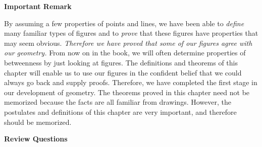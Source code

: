 \documentclass[11pt]{book}
\theoremstyle{bkplain}
\theoremstyle{XIplainnote}
\theoremstyle{bkplain}
\theoremstyle{bkplain}
\begin{document}
\begin{center}\bfseries Important Remark\end{center}

By assuming a few properties of points and lines, we have been able to
\emph{define} many familiar types of figures and to \emph{prove} that these
figures have properties that may seem obvious. \emph{Therefore we have proved
that some of our figures agree with our geometry.} From now on in the book, we
will often determine properties of betweenness by just looking at figures. The
definitions and theorems of this chapter will enable us to use our figures in the
confident belief that we could always go back and supply proofs. Therefore, we
have completed the first stage in our development of geometry. The theorems
proved in this chapter need not be memorized because the facts are all familiar
from drawings. However, the postulates and definitions of this chapter are very
important, and therefore should be memorized.

\begin{center}\bfseries Review Questions\end{center}
\end{document}
